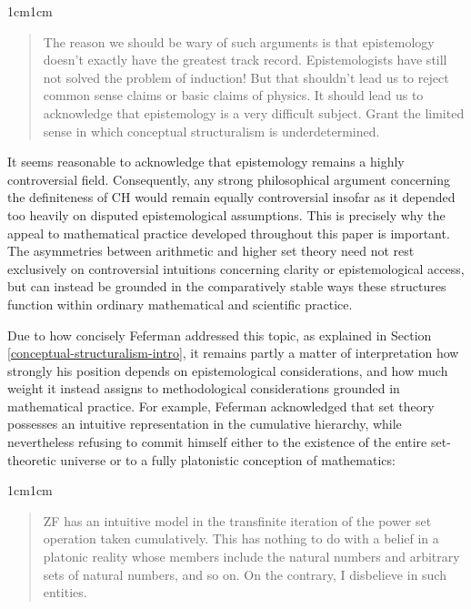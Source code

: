 \documentclass[11pt,a4paper]{book}
\theoremstyle{plain}
\begin{document}
\begin{adjustwidth}{1cm}{1cm}
\begin{quote}
\small
The reason we should be wary of such arguments is that epistemology doesn't exactly have the greatest track record. Epistemologists have still not solved the problem of induction! But that shouldn't lead us to reject common sense claims or basic claims of physics. It should lead us to acknowledge that epistemology is a very difficult subject. Grant the limited sense in which conceptual structuralism is underdetermined. \textcite[506]{Koellner2016}
\end{quote}
\end{adjustwidth}

It seems reasonable to acknowledge that epistemology remains a highly controversial field. Consequently, any strong philosophical argument concerning the definiteness of CH would remain equally controversial insofar as it depended too heavily on disputed epistemological assumptions. This is precisely why the appeal to mathematical practice developed throughout this paper is important. The asymmetries between arithmetic and higher set theory need not rest exclusively on controversial intuitions concerning clarity or epistemological access, but can instead be grounded in the comparatively stable ways these structures function within ordinary mathematical and scientific practice.

Due to how concisely Feferman addressed this topic, as explained in Section \ref{conceptual-structuralism-intro}, it remains partly a matter of interpretation how strongly his position depends on epistemological considerations, and how much weight it instead assigns to methodological considerations grounded in mathematical practice. For example, Feferman acknowledged that set theory possesses an intuitive representation in the cumulative hierarchy, while nevertheless refusing to commit himself either to the existence of the entire set-theoretic universe or to a fully platonistic conception of mathematics:

\begin{adjustwidth}{1cm}{1cm}
\begin{quote}
\small
ZF has an intuitive model in the transfinite iteration of the power set operation taken cumulatively. This has nothing to do with a belief in a platonic reality whose members include the natural numbers and arbitrary sets of natural numbers, and so on. On the contrary, I disbelieve in such entities. \textcite[72]{Feferman2000rationale}
\end{quote}
\end{adjustwidth}
\end{document}
